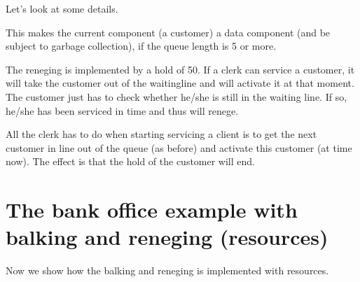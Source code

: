 \documentclass[letterpaper,10pt,english]{sphinxmanual}
\begin{document}
\begin{sphinxVerbatim}[commandchars=\\\{\}]
\end{sphinxVerbatim}

Let’s look at some details.

\begin{sphinxVerbatim}[commandchars=\\\{\}]
 
\end{sphinxVerbatim}

This makes the current component (a customer) a data component (and be subject to
garbage collection), if the queue length is 5 or more.

The reneging is implemented by a hold of 50. If a clerk can service a customer, it will take
the customer out of the waitingline and will activate it at that moment. The customer just has to check
whether he/she is still in the waiting line. If so, he/she has been serviced in time and thus will renege.

\begin{sphinxVerbatim}[commandchars=\\\{\}]
 
   
      
\end{sphinxVerbatim}

All the clerk has to do when starting servicing a client is to get the next customer in line
out of the queue (as before) and activate this customer (at time now). The effect is that the hold
of the customer will end.

\begin{sphinxVerbatim}[commandchars=\\\{\}]
  
\end{sphinxVerbatim}


\section{The bank office example with balking and reneging (resources)}
\label{\detokenize{Modeling:the-bank-office-example-with-balking-and-reneging-resources}}
Now we show how the balking and reneging is implemented with resources.
\end{document}
